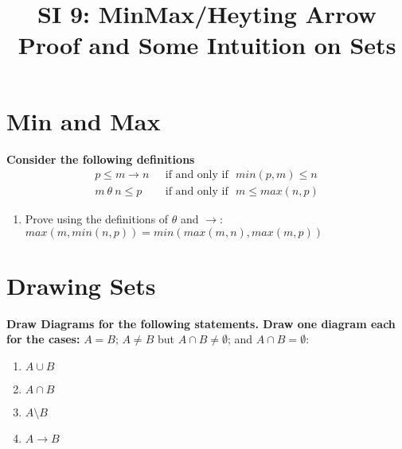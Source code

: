 \documentclass[12pt]{article}
\date{}
\author{}
\title{SI 9: MinMax/Heyting Arrow Proof and Some Intuition on Sets}
\begin{document}
\maketitle
\section{Min and Max}
	\textbf{Consider the following definitions}
	\begin{align*}
	p\leq m \to n \:\:\:&\text{if and only if}\:\:\: min(p,m)\leq n\\
	m \:\theta\: n \leq p\:\:\: &\text{if and only if}\:\:\: m\leq max(n,p) 
	\end{align*}
	\begin{enumerate}[resume]
		\item Prove using the definitions of $\theta$ and $\to$: $max(m,min(n,p))=min(max(m,n),max(m,p))$
	\end{enumerate}
\section{Drawing Sets}
\textbf{Draw Diagrams for the following statements. Draw one diagram each for the cases:} $A=B$; $A\neq B$ but $A\cap B\neq \emptyset$; and $A\cap B=\emptyset$:
	\begin{enumerate}
		\item $A\cup B$
		\item $A\cap B$
		\item $A\setminus B$
		\item $A\to B$
	\end{enumerate}
\end{document}
